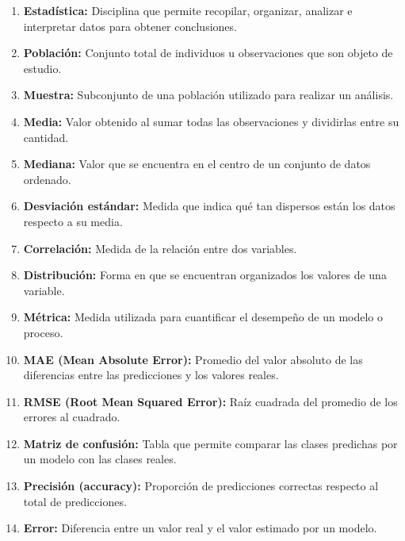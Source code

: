 \begin{enumerate}
  \item \textbf{Estadística:} Disciplina que permite recopilar, organizar, analizar e interpretar datos para obtener conclusiones.
  \item \textbf{Población:} Conjunto total de individuos u observaciones que son objeto de estudio.
  \item \textbf{Muestra:} Subconjunto de una población utilizado para realizar un análisis.
  \item \textbf{Media:} Valor obtenido al sumar todas las observaciones y dividirlas entre su cantidad.
  \item \textbf{Mediana:} Valor que se encuentra en el centro de un conjunto de datos ordenado.
  \item \textbf{Desviación estándar:} Medida que indica qué tan dispersos están los datos respecto a su media.
  \item \textbf{Correlación:} Medida de la relación entre dos variables.
  \item \textbf{Distribución:} Forma en que se encuentran organizados los valores de una variable.
  \item \textbf{Métrica:} Medida utilizada para cuantificar el desempeño de un modelo o proceso.
  \item \textbf{MAE (Mean Absolute Error):} Promedio del valor absoluto de las diferencias entre las predicciones y los valores reales.
  \item \textbf{RMSE (Root Mean Squared Error):} Raíz cuadrada del promedio de los errores al cuadrado.
  \item \textbf{Matriz de confusión:} Tabla que permite comparar las clases predichas por un modelo con las clases reales.
  \item \textbf{Precisión (accuracy):} Proporción de predicciones correctas respecto al total de predicciones.
  \item \textbf{Error:} Diferencia entre un valor real y el valor estimado por un modelo.
\end{enumerate}
